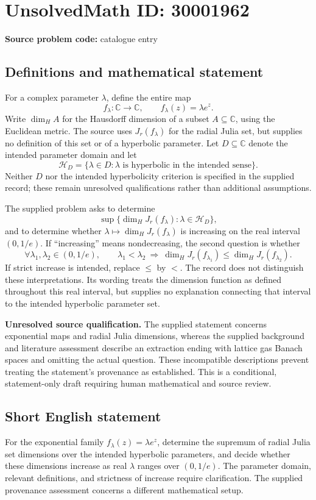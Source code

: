 \documentclass[11pt]{article}
\newcommand{\C}{\mathbb{C}}
\begin{document}
\section*{UnsolvedMath ID: 30001962}
\textbf{Source problem code:} catalogue entry
\subsection{Definitions and mathematical statement}
For a complex parameter \(\lambda\), define the entire map
\[
 f_\lambda:\C\longrightarrow\C,\qquad f_\lambda(z)=\lambda e^z.
\]
Write \(\dim_H A\) for the Hausdorff dimension of a subset \(A\subseteq\C\), using the Euclidean metric. The source uses \(J_r(f_\lambda)\) for the radial Julia set, but supplies no definition of this set or of a hyperbolic parameter. Let \(D\subseteq\C\) denote the intended parameter domain and let
\[
 \mathcal H_D=\{\lambda\in D:\lambda\text{ is hyperbolic in the intended sense}\}.
\]
Neither \(D\) nor the intended hyperbolicity criterion is specified in the supplied record; these remain unresolved qualifications rather than additional assumptions.

The supplied problem asks to determine
\[
 \sup\bigl\{\dim_H J_r(f_\lambda):\lambda\in\mathcal H_D\bigr\},
\]
and to determine whether \(\lambda\mapsto\dim_H J_r(f_\lambda)\) is increasing on the real interval \((0,1/e)\). If ``increasing'' means nondecreasing, the second question is whether
\[
 \forall\lambda_1,\lambda_2\in(0,1/e),\qquad
 \lambda_1<\lambda_2\ \Longrightarrow\
 \dim_H J_r(f_{\lambda_1})\leq\dim_H J_r(f_{\lambda_2}).
\]
If strict increase is intended, replace \(\leq\) by \(<\). The record does not distinguish these interpretations. Its wording treats the dimension function as defined throughout this real interval, but supplies no explanation connecting that interval to the intended hyperbolic parameter set.

\textbf{Unresolved source qualification.} The supplied statement concerns exponential maps and radial Julia dimensions, whereas the supplied background and literature assessment describe an extraction ending with lattice gas Banach spaces and omitting the actual question. These incompatible descriptions prevent treating the statement's provenance as established. This is a conditional, statement-only draft requiring human mathematical and source review.
\subsection{Short English statement}
For the exponential family \(f_\lambda(z)=\lambda e^z\), determine the supremum of radial Julia set dimensions over the intended hyperbolic parameters, and decide whether these dimensions increase as real \(\lambda\) ranges over \((0,1/e)\). The parameter domain, relevant definitions, and strictness of increase require clarification. The supplied provenance assessment concerns a different mathematical setup.
\end{document}
